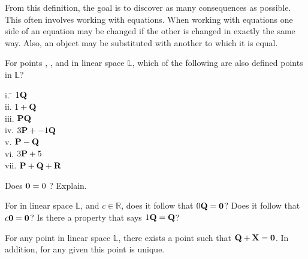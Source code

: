  From this definition, the goal is to discover as many consequences as possible. This often involves working with equations. When working with equations one side of an equation may be changed if  the other is changed in exactly the same way. Also, an object  may be substituted with another to which it is equal. 
 
 \begin{myexa}[\bd{a}]
 	For points , , and  in linear space $\mathbb{L}$, which of the following are also defined points in $\mathbb{L}$?
 	\begin{tabbing}
 		\indent i. \quad \= $1\textbf{Q}$\\
 		\indent ii. \> $1+\textbf{Q}$\\
 		\indent iii.\> $\textbf{P}\textbf{Q}$\\
 		\indent iv. \> $3\textbf{P} + -1\textbf{Q}$\\
 		\indent v.  \>  $\textbf{P} - \textbf{Q}$\\
 		\indent vi. \> $3\textbf{P} + 5$\\
 		\indent vii.\> $\textbf{P} + \textbf{Q}+ \textbf{R}$\\	
 	\end{tabbing}
 \end{myexa}
 
 \begin{myexb}[\bd{b}]
    Does $\textbf{0} = 0$ ? Explain.
 \end{myexb}


\begin{myexc}[\bd{c}]
For  in linear space $\mathbb{L}$, and $c \in \mathbb{R}$, does it follow that $0\textbf{Q}=\textbf{0}$? Does it follow that $c\textbf{0} = \textbf{0}$? Is there a property that says $1\textbf{Q} = \textbf{Q}$?
\end{myexc}

\begin{theorem}
	For any point  in linear space $\mathbb{L}$, there exists a point  such that $\textbf{Q} + \textbf{X} = \textbf{0}$. In addition, for any given  this point is unique. 
\end{theorem}
\vspace{-.3in}\hspace{5in}\begin{annotation}
\end{annotation}
 

